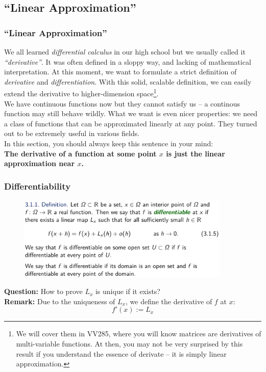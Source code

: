 \documentclass[10pt, t]{beamer}
\renewcommand{\emph}[1]{{\color{themecolor}\textsl{#1}}}
\newcommand{\nullspace}{~\\[15pt]}
\newcommand{\remark}{\textbf{Remark: }}
\newcommand{\question}{\textbf{Question: }}
\begin{document}
\subsection{``Linear Approximation''}
\begin{frame}
    \frametitle{``Linear Approximation''}

    We all learned \emph{differential calculus} in our high school but we usually called it \emph{``derivative''}. It was often defined in a sloppy way, and lacking of mathematical interpretation. At this moment, we want to formulate a strict definition of \emph{derivative} and \emph{differentiation}. With this solid, scalable definition, we can easily extend the derivative to higher-dimension space\footnote[frame]{We will cover them in VV285, where you will know matrices are derivatives of  multi-variable functions. At then, you may not be very surprised by this result if you understand the essence of derivate -- it is simply linear approximation.}.
    \nullspace
    We have continuous functions now but they cannot satisfy us -- a continous function may still behave wildly. What we want is even nicer properties: we need a class of functions that can be approximated linearly at any point. They turned out to be extremely useful in various fields.
    \nullspace
    In this section, you should always keep this sentence in your mind:
    \nullspace
    \textbf{The derivative of a function at some point $x$ is just the linear approximation near $x$.}
\end{frame}

\begin{frame}
    \frametitle{Differentiability}

    \begin{figure}[H]
        \centering
        \includegraphics[width=0.9\textwidth]{2020-10-28-13-31-40.png}
    \end{figure}

    \question How to prove $L_x$ is unique if it exists?
    \nullspace
    \remark Due to the uniqueness of $L_x$, we define the derivative of $f$ at $x$: $$f'(x):=L_x$$
\end{frame}
\end{document}
